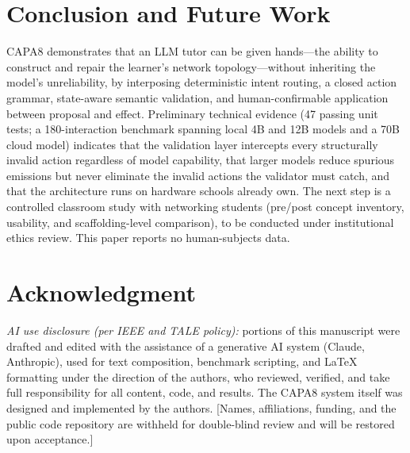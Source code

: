 \documentclass[conference,a4paper]{IEEEtran}
\newcommand{\bTotalCalls}{180}   %
\begin{document}
\section{Conclusion and Future Work}
CAPA8 demonstrates that an LLM tutor can be given hands---the ability to construct and repair the learner's network topology---without inheriting the model's unreliability, by interposing deterministic intent routing, a closed action grammar, state-aware semantic validation, and human-confirmable application between proposal and effect. Preliminary technical evidence (47 passing unit tests; a \bTotalCalls-interaction benchmark spanning local 4B and 12B models and a 70B cloud model) indicates that the validation layer intercepts every structurally invalid action regardless of model capability, that larger models reduce spurious emissions but never eliminate the invalid actions the validator must catch, and that the architecture runs on hardware schools already own. The next step is a controlled classroom study with networking students (pre/post concept inventory, usability, and scaffolding-level comparison), to be conducted under institutional ethics review. This paper reports no human-subjects data.

\section*{Acknowledgment}
\textit{AI use disclosure (per IEEE and TALE policy):} portions of this manuscript were drafted and edited with the assistance of a generative AI system (Claude, Anthropic), used for text composition, benchmark scripting, and LaTeX formatting under the direction of the authors, who reviewed, verified, and take full responsibility for all content, code, and results. The CAPA8 system itself was designed and implemented by the authors. [Names, affiliations, funding, and the public code repository are withheld for double-blind review and will be restored upon acceptance.]
\end{document}
